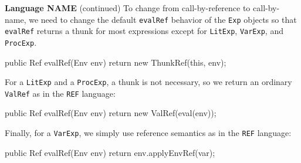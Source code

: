 \begin{minipage}[t]{\sw}
\slidenumber
\LARGE
{\bf Language NAME} (continued)\exx
To change from call-by-reference to call-by-name,
we need to change the default \verb'evalRef' behavior
of the \verb'Exp' objects
so that \verb'evalRef' returns a thunk
for most expressions except
for \verb'LitExp', \verb'VarExp', and \verb'ProcExp'.
\Large
\begin{qv}
public Ref evalRef(Env env) {
    return new ThunkRef(this, env);
}
\end{qv}
\LARGE
For a \verb'LitExp' and a \verb'ProcExp',
a thunk is not necessary,
so we return an ordinary \verb'ValRef' as in the \verb'REF' language:
\Large
\begin{qv}
public Ref evalRef(Env env) {
    return new ValRef(eval(env));
}
\end{qv}
\LARGE
Finally, for a \verb'VarExp', we simply use reference semantics
as in the \verb'REF' language:
\Large
\begin{qv}
public Ref evalRef(Env env) {
    return env.applyEnvRef(var);
}
\end{qv}
\end{minipage}
